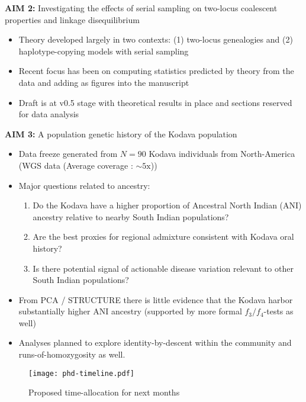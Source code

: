 \documentclass[a4paper, 10.5pt]{article}
\begin{document}
 \noindent \textbf{AIM 2:} Investigating the effects of serial sampling on two-locus coalescent properties and linkage disequilibrium\\
  \begin{itemize}
    \item Theory developed largely in two contexts: (1) two-locus genealogies and (2) haplotype-copying models with serial sampling 
    \item Recent focus has been on computing statistics predicted by theory from the data and adding as figures into the manuscript 
    \item Draft is at v0.5 stage with theoretical results in place and sections reserved for data analysis 
  \end{itemize}

 \noindent \textbf{AIM 3:} A population genetic history of the Kodava population\\
  \begin{itemize}
    \item Data freeze generated from $N = 90$ Kodava individuals from North-America (WGS data (Average coverage : $\sim 5\text{x}$))
    \item Major questions related to ancestry:
      \begin{enumerate}
        \item Do the Kodava have a higher proportion of Ancestral North Indian (ANI) ancestry relative to nearby South Indian populations?
        \item Are the best proxies for regional admixture consistent with Kodava oral history?
        \item Is there potential signal of actionable disease variation relevant to other South Indian populations? 
 \end{enumerate}
    \item From PCA / STRUCTURE there is little evidence that the Kodava harbor substantially higher ANI ancestry (supported by more formal $f_3/f_4$-tests as well)
    \item Analyses planned to explore identity-by-descent within the community and runs-of-homozygosity as well. 
 \end{itemize}




\vspace*{2em}
\begin{figure}[H]
  \centering
  \texttt{[image: phd-timeline.pdf]}
  \caption*{Proposed time-allocation for next months}
\end{figure}
\end{document}
